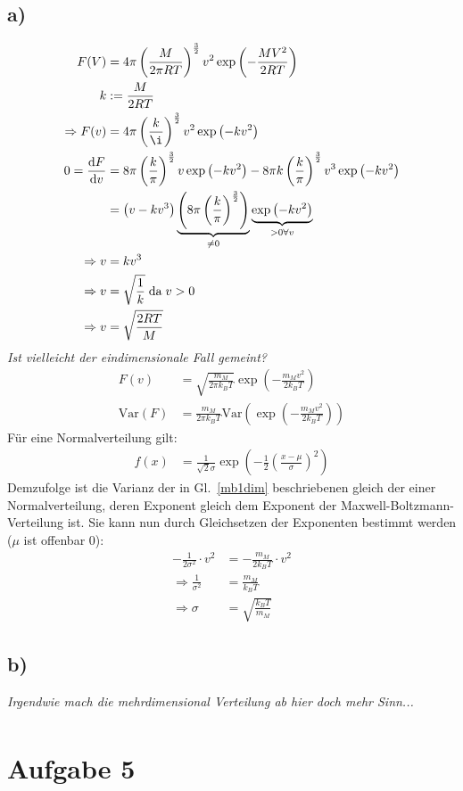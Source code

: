 \documentclass[12pt,a4paper,notitlepage]{article}
\newcommand{\diff}{\mathrm{d}}
\newcommand{\aufgabe}[1]{\section*{\setcounter{section}{#1}Aufgabe #1}}
\begin{document}
\subsection*{a)}
\begin{align}
F(V)&=4\pi\left(\frac{M}{2\pi RT}\right)^{\frac{3}{2}}v^2\exp\left(-\frac{MV^2}{2RT}\right)\\
k&:=\frac{M}{2RT}\\
\Rightarrow F(v)&=4\pi\left(\frac{k}{\i}\right)^\frac{3}{2}v^2\exp\left(-kv^2\right)\\
0=\frac{\diff F}{\diff v}&=8\pi\left(\frac{k}{\pi}\right)^\frac{3}{2}v\exp\left(-kv^2\right)-8\pi k\left(\frac{k}{\pi}\right)^\frac{3}{2}v^3\exp\left(-kv^2\right)\\
&=\left(v-kv^3\right)\underbrace{\left(8\pi\left(\frac{k}{\pi}\right)^\frac{3}{2}\right)}_{\neq 0}\underbrace{\exp\left(-kv^2\right)}_{>0\forall v}\\
\Rightarrow v&=kv^3\\
\Rightarrow v&=\sqrt{\frac{1}{k}}\;\text{da}\;v>0\\
\Rightarrow v&=\sqrt{\frac{2RT}{M}}
\end{align}
\emph{Ist vielleicht der eindimensionale Fall gemeint?}
\begin{align}
F(v)&=\sqrt{\frac{m_M}{2\pi k_BT}}\exp\left(-\frac{m_Mv^2}{2k_BT}\right)\label{mb1dim}\\
\mathrm{Var}(F)&=\frac{m_M}{2\pi k_BT}\mathrm{Var}\left(\exp\left(-\frac{m_Mv^2}{2k_BT}\right)\right)
\end{align}
Für eine Normalverteilung gilt:
\begin{align}
f(x)&=\frac{1}{\sqrt{2}\sigma}\exp\left(-\frac{1}{2}\left(\frac{x-\mu}{\sigma}\right)^2\right)
\end{align}
Demzufolge ist die Varianz der in Gl.\ \ref{mb1dim} beschriebenen gleich der einer Normalverteilung, deren Exponent gleich dem Exponent der Maxwell-Boltzmann-Verteilung ist. Sie kann nun durch Gleichsetzen der Exponenten bestimmt werden ($\mu$ ist offenbar 0):
\begin{align}
-\frac{1}{2\sigma^2}\cdot v^2&=-\frac{m_M}{2k_BT}\cdot v^2\\
\Rightarrow \frac{1}{\sigma^2}&=\frac{m_M}{k_BT}\\
\Rightarrow \sigma&=\sqrt{\frac{k_BT}{m_M}}
\end{align}
\subsection*{b)}
\emph{Irgendwie mach die mehrdimensional Verteilung ab hier doch mehr Sinn...}
\begin{align}
\end{align}
\aufgabe{5}
\end{document}
